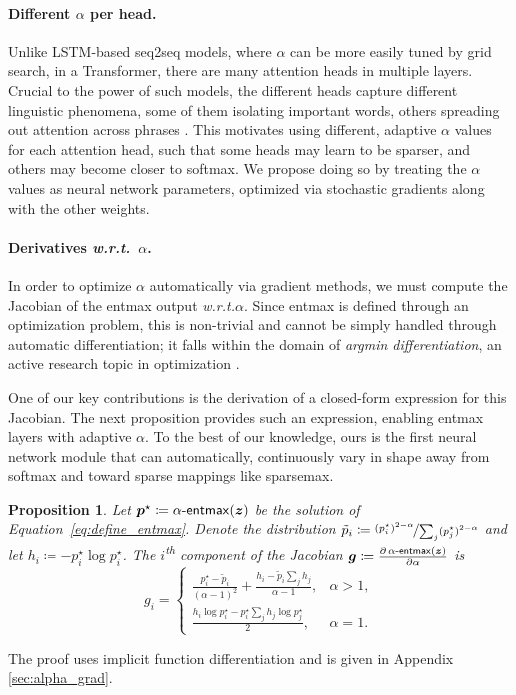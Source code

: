 \documentclass[11pt,a4paper]{article}
\makeatletter
\newtheorem{proposition}{Proposition}
\newcommand*{\wrt}{\textit{w.\hspace{.07em}r\hspace{.07em}.t.}\@\xspace}
\newcommand{\pfrac}[2]{\frac{\partial #1}{\partial #2}}
\newcommand\pp{p}
\newcommand\p{\bm{\pp}}
\newcommand\xx{z}
\newcommand\x{\bm{\xx}}
\newcommand{\eqnref}[1]{Equation~\ref{eq:#1}}
\newcommand*\entmaxtext{entmax\xspace}
\newcommand*\aentmax[1][\alpha]{\mathop{\mathsf{#1}\textnormal{-}\mathsf{\entmaxtext}}}
\makeatother
\begin{document}
\paragraph{Different {\boldmath $\alpha$} per head.}
Unlike LSTM-based seq2seq models, where $\alpha$ can be more easily
tuned by grid search, in a Transformer, there are many attention
heads in multiple layers. Crucial to the power of such models, the
different heads capture different linguistic phenomena, some of them
isolating important words, others spreading out attention across
phrases \citep[Figure~5]{vaswani2017attention}. This motivates using
different, adaptive $\alpha$ values for each attention head, such
that some heads may learn to be sparser, and others may become closer
to softmax. We propose doing so by treating the $\alpha$ values as
neural network parameters, optimized via stochastic gradients along
with the other weights.

\paragraph{Derivatives \wrt~{\boldmath $\alpha$}.}
In order to optimize $\alpha$ automatically via gradient methods, we
must compute the Jacobian of the \entmaxtext output \wrt $\alpha$.
Since \entmaxtext is defined through an optimization problem, this is
non-trivial and cannot be simply handled through automatic
differentiation; it falls within the domain of \emph{argmin
differentiation}, an active research topic in optimization
\citep{gould,optnet}.

One of our key contributions is the derivation of a closed-form
expression for this Jacobian. The next proposition provides
such an expression, enabling \entmaxtext layers with
adaptive $\alpha$. To the best of our knowledge, ours is the first
neural network module that can automatically, continuously vary in
shape away from softmax and toward sparse mappings like sparsemax.

\begin{proposition}\label{prop:grad_alpha}Let $\p^\star \coloneqq \aentmax(\x)$ be the solution of
\eqnref{define_entmax}.
Denote the distribution $\tilde{\pp}_i \coloneqq \nicefrac{(\pp_i^\star)^{2 - \alpha}}{
\sum_j(\pp_j^\star)^{2-\alpha}}$ and let
$h_i \coloneqq -\pp^\star_i \log \pp^\star_i$.
The $i$\textsuperscript{th} component of the Jacobian
$\bm{g} \coloneqq \pfrac{\aentmax(\x)}{\alpha}$ is
\begin{equation}\label{eq:final_gradient_alpha_supp}
g_i =\begin{cases}
    \frac{p_i^{\star} - \tilde{\pp}_i}{(\alpha-1)^2} +
\frac{h_i - \tilde{\pp}_i\sum_j h_j}{\alpha-1}, & \alpha > 1,\\[1.5ex]
\frac{h_i \log \pp_i^{\star} - \pp_i^{\star} \sum_j h_j \log p_j^{\star}}{2}, & \alpha = 1.
\end{cases}
\end{equation}
\end{proposition}
\noindent The proof uses implicit function differentiation and is given in Appendix \ref{sec:alpha_grad}.
\end{document}
